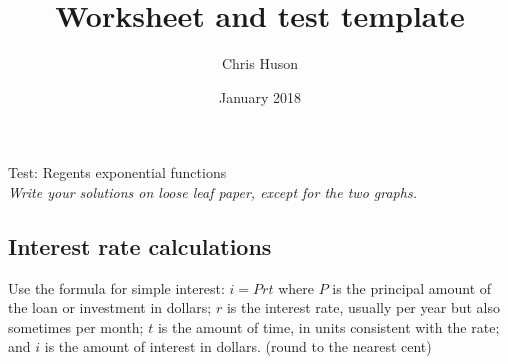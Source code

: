 \documentclass[12pt, oneside]{article}
\title{Worksheet and test template}
\author{Chris Huson}
\date{January 2018}
\begin{document}
\begin{center}
{\Large Test: Regents exponential functions} \\
\textit{Write your solutions on loose leaf paper, except for the two graphs.}
\end{center}

\subsection*{Interest rate calculations}

Use the formula for simple interest: $i=Prt$ where $P$ is the principal amount of the loan or investment in dollars; $r$ is the interest rate, usually per year but also sometimes per month; $t$ is the amount of time, in units consistent with the rate; and $i$ is the amount of interest in dollars. (round to the nearest cent)
\end{document}
